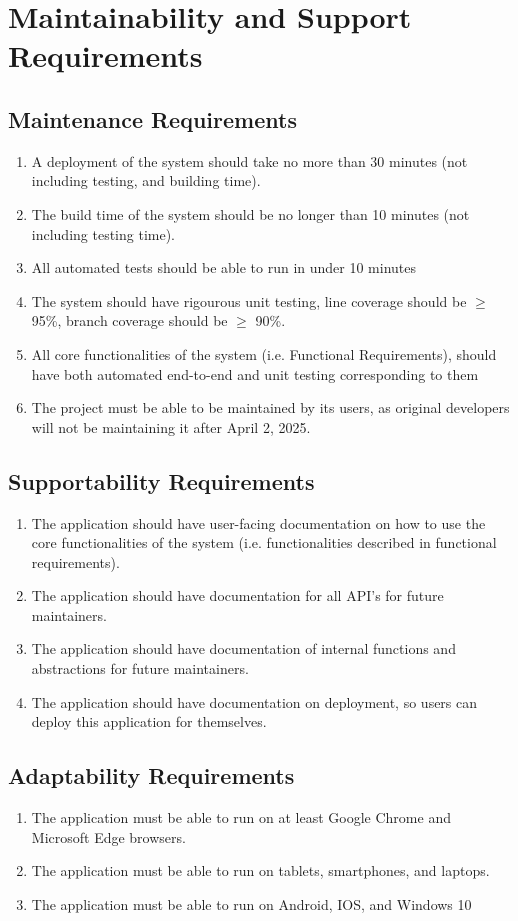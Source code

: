 \documentclass[12pt]{article}
\begin{document}
\section{Maintainability and Support Requirements}
\subsection{Maintenance Requirements}
\begin{enumerate} [{MS-MTN}1.]
  \item A deployment of the system should take no more than 30 minutes (not
    including testing, and building time).
  \item The build time of the system should be no longer than 10 minutes (not
    including testing time).
  \item All automated tests should be able to run in under 10 minutes
  \item The system should have rigourous unit testing, line coverage should be
    $\ge$ 95\%, branch coverage should be $\ge$ 90\%.
  \item All core functionalities of the system (i.e. Functional Requirements),
    should have both automated end-to-end and unit testing corresponding to them
  \item The project must be able to be maintained by its users, as original
    developers will not be maintaining it after April 2, 2025.
\end{enumerate}
\subsection{Supportability Requirements}
\begin{enumerate} [{MS-SUP}1.]
  \item The application should have user-facing documentation on how to use the
    core functionalities of the system (i.e. functionalities described in
    functional requirements).
  \item The application should have documentation for all API's for future
    maintainers.
  \item The application should have documentation of internal functions and
    abstractions for future maintainers.
  \item The application should have documentation on deployment, so users can
    deploy this application for themselves.
\end{enumerate}
\subsection{Adaptability Requirements}
\begin{enumerate} [{MS-ADP}1.]
  \item The application must be able to run on at least Google Chrome and
    Microsoft Edge browsers.
  \item The application must be able to run on tablets, smartphones, and
    laptops.
  \item The application must be able to run on Android, IOS, and Windows 10
\end{enumerate}
\end{document}
